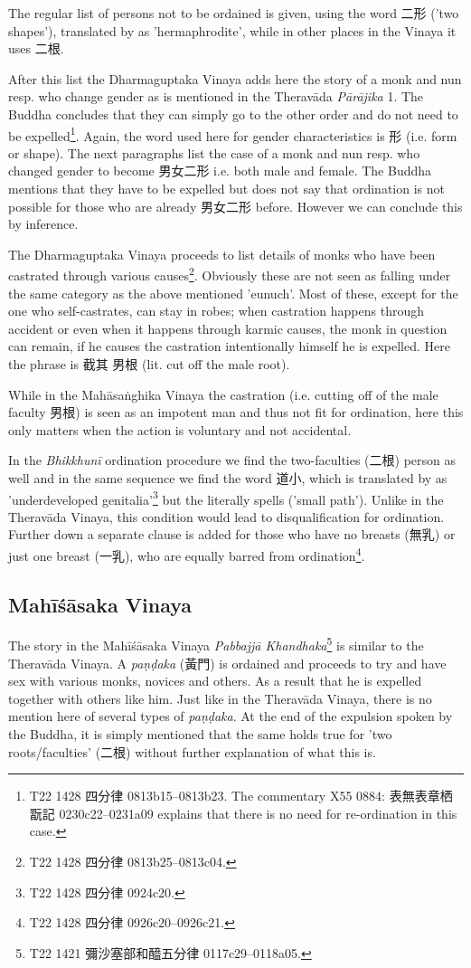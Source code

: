 The regular list of persons not to be ordained is given, using the word 二形 ('two shapes'), translated by \cite{bodhi} as 'hermaphrodite', while in other places in the Vinaya it uses 二根. 

After this list the Dharmaguptaka Vinaya adds here the story of a monk and nun resp. who change gender as is mentioned in the Theravāda {\em Pārājika} 1. The Buddha concludes that they can simply go to the other order and do not need to be expelled\footnote{T22 1428 四分律 0813b15–0813b23. The commentary X55 0884: 表無表章栖翫記 0230c22–0231a09 explains that there is no need for re-ordination in this case.}. Again, the word used here for gender characteristics is 形 (i.e. form or shape). The next paragraphs list the case of a monk and nun resp. who changed gender to become 男女二形 i.e. both male and female. The Buddha mentions that they have to be expelled but does not say that ordination is not possible for those who are already 男女二形 before. However we can conclude this by inference.

The Dharmaguptaka Vinaya proceeds to list details of monks who have been castrated through various causes\footnote{T22 1428 四分律 0813b25–0813c04.}. Obviously these are not seen as falling under the same category as the above mentioned 'eunuch'. Most of these, except for the one who self-castrates, can stay in robes; when castration happens through accident or even when it happens through karmic causes, the monk in question can remain, if he causes the castration intentionally himself he is expelled. Here the phrase is 截其 男根 (lit. cut off the male root).

While in the Mahāsaṅghika Vinaya the castration (i.e. cutting off of the male faculty 男根) is seen as an impotent man and thus not fit for ordination, here this only matters when the action is voluntary and not accidental.

In the {\em Bhikkhunī} ordination procedure we find the two-faculties (二根) person as well and in the same sequence we find the word 道小, which is translated by \cite{bodhi} as 'underdeveloped genitalia'\footnote{T22 1428 四分律 0924c20.} but the literally spells ('small path'). Unlike in the Theravāda Vinaya, this condition would lead to disqualification for ordination. Further down a separate clause is added for those who have no breasts (無乳) or just one breast (一乳), who are equally barred from ordination\footnote{T22 1428 四分律 0926c20–0926c21.}.


\subsection{Mahīśāsaka Vinaya}
The story in the Mahīśāsaka Vinaya {\em Pabbajjā Khandhaka}\footnote{T22 1421 彌沙塞部和醯五分律 0117c29–0118a05.} is similar to the Theravāda Vinaya. A {\em paṇḍaka} (黃門) is ordained and proceeds to try and have sex with various monks, novices and others. As a result that he is expelled together with others like him. Just like in the Theravāda Vinaya, there is no mention here of several types of {\em paṇḍaka}. At the end of the expulsion spoken by the Buddha, it is simply mentioned that the same holds true for 'two roots/faculties' (二根) without further explanation of what this is.

